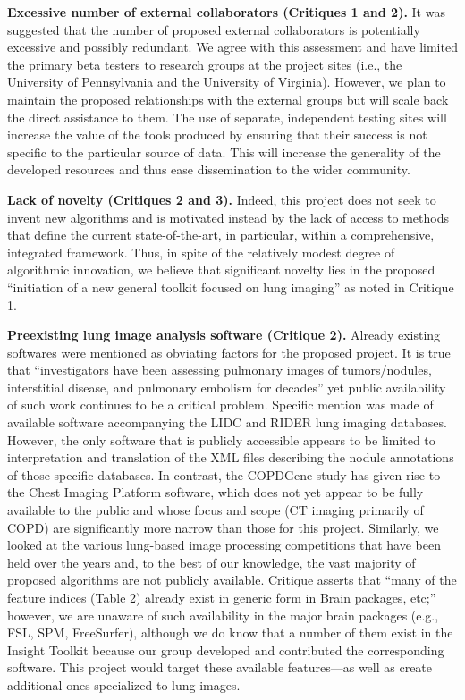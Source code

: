 \documentclass[11pt,]{article}
\begin{document}
\textbf{Excessive number of external collaborators (Critiques 1 and 2).}
It was suggested that the number of proposed external collaborators is
potentially excessive and possibly redundant. We agree with this
assessment and have limited the primary beta testers to research groups
at the project sites (i.e., the University of Pennsylvania and the
University of Virginia). However, we plan to maintain the proposed
relationships with the external groups but will scale back the direct
assistance to them. The use of separate, independent testing sites will
increase the value of the tools produced by ensuring that their success
is not specific to the particular source of data. This will increase the
generality of the developed resources and thus ease dissemination to the
wider community.

\textbf{Lack of novelty (Critiques 2 and 3).} Indeed, this project does
not seek to invent new algorithms and is motivated instead by the lack
of access to methods that define the current state-of-the-art, in
particular, within a comprehensive, integrated framework. Thus, in spite
of the relatively modest degree of algorithmic innovation, we believe
that significant novelty lies in the proposed ``initiation of a new
general toolkit focused on lung imaging'' as noted in Critique 1.

\textbf{Preexisting lung image analysis software (Critique 2).} Already
existing softwares were mentioned as obviating factors for the proposed
project. It is true that ``investigators have been assessing pulmonary
images of tumors/nodules, interstitial disease, and pulmonary embolism
for decades'' yet public availability of such work continues to be a
critical problem. Specific mention was made of available software
accompanying the LIDC and RIDER lung imaging databases. However, the
only software that is publicly accessible appears to be limited to
interpretation and translation of the XML files describing the nodule
annotations of those specific databases. In contrast, the COPDGene study
has given rise to the Chest Imaging Platform software, which does not
yet appear to be fully available to the public and whose focus and scope
(CT imaging primarily of COPD) are significantly more narrow than those
for this project. Similarly, we looked at the various lung-based image
processing competitions that have been held over the years and, to the
best of our knowledge, the vast majority of proposed algorithms are not
publicly available. Critique asserts that ``many of the feature indices
(Table 2) already exist in generic form in Brain packages, etc;''
however, we are unaware of such availability in the major brain packages
(e.g., FSL, SPM, FreeSurfer), although we do know that a number of them
exist in the Insight Toolkit because our group developed and contributed
the corresponding software. This project would target these available
features---as well as create additional ones specialized to lung images.
\end{document}
